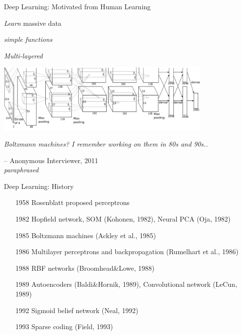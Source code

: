 \documentclass{beamer}
\begin{document}
\begin{frame}{Deep Learning: Motivated from Human Learning}
     \begin{minipage}{0.32\textwidth}
         \centering
         \small
         \textit{Learn} massive data
     \end{minipage}
     \hfill
     \begin{minipage}{0.32\textwidth}
         \centering
         \small
         \textit{simple functions}
     \end{minipage}
     \hfill
     \begin{minipage}{0.32\textwidth}
         \centering
         \small
         \textit{Multi-layered} 
     \end{minipage}

     \vspace{3mm}
    \centering
    \includegraphics[width=0.8\textwidth]{alex_imagenet}
    \\

    \vfill

\end{frame}

\begin{frame}
\centering
\emph{Boltzmann machines? I remember working on them in 80s and 90s..}

\vspace{2.5mm}
\begin{flushright}
-- Anonymous Interviewer, 2011 \\ {\small \emph{paraphrased}}
    \end{flushright}
\end{frame}

\begin{frame}{Deep Learning: History}

\begin{enumerate}
\item[1958] Rosenblatt proposed perceptrons 
\item[1982] Hopfield network, SOM {\scriptsize (Kohonen, 1982)}, Neural PCA {\scriptsize (Oja, 1982)}
\item[1985] Boltzmann machines {\scriptsize (Ackley et al., 1985)}
\item[1986] Multilayer perceptrons and backpropagation {\scriptsize (Rumelhart et al., 1986)}
\item[1988] RBF networks {\scriptsize (Broomhead\&Lowe, 1988)}
\item[1989] Autoencoders {\scriptsize (Baldi\&Hornik, 1989)}, Convolutional network {\scriptsize (LeCun, 1989)}
\item[1992] Sigmoid belief network {\scriptsize (Neal, 1992)}
\item[1993] Sparse coding {\scriptsize (Field, 1993)}
\end{enumerate}

\end{frame}
\end{document}
